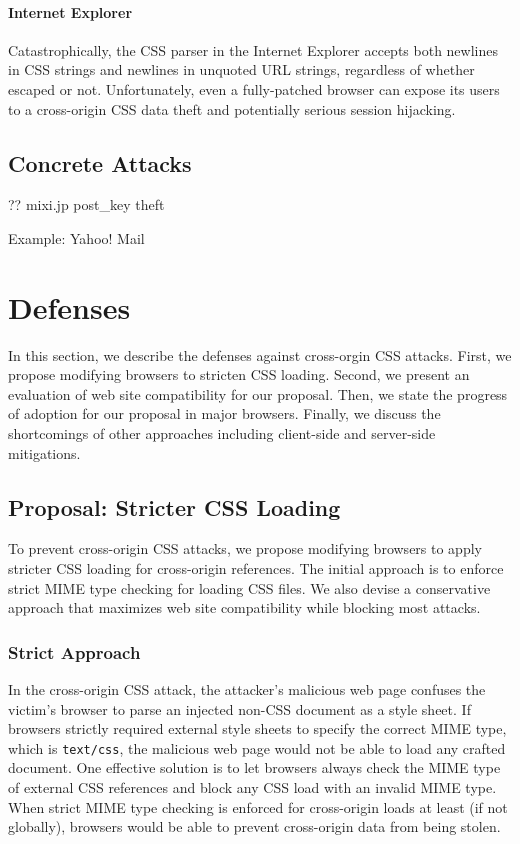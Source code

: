 \documentclass{acm_proc_article-sp}
\begin{document}
{\paragraph{Internet Explorer}
Catastrophically, the CSS parser in the Internet Explorer accepts both newlines in CSS strings and newlines in unquoted URL strings, regardless of whether escaped or not. Unfortunately, even a fully-patched browser can expose its users to a cross-origin CSS data theft and potentially serious session hijacking.

\subsection{Concrete Attacks}
?? mixi.jp post\_key theft\cite{cssxss}

Example: Yahoo! Mail

\section{Defenses}
In this section, we describe the defenses against cross-orgin CSS attacks. First, we propose modifying browsers to stricten CSS loading. Second, we present an evaluation of web site compatibility for our proposal. Then, we state the progress of adoption for our proposal in major browsers. Finally, we discuss the shortcomings of other approaches including client-side and server-side mitigations.

\subsection{Proposal: Stricter CSS Loading}
To prevent cross-origin CSS attacks, we propose modifying browsers to apply stricter CSS loading for cross-origin references. The initial approach is to enforce strict MIME type checking for loading CSS files. We also devise a conservative approach that maximizes web site compatibility while blocking most attacks.

\subsubsection{Strict Approach}
In the cross-origin CSS attack, the attacker's malicious web page confuses the victim's browser to parse an injected non-CSS document as a style sheet. If browsers strictly required external style sheets to specify the correct MIME type, which is \texttt{text/css}, the malicious web page would not be able to load any crafted document. One effective solution is to let browsers always check the MIME type of external CSS references and block any CSS load with an invalid MIME type. When strict MIME type checking is enforced for cross-origin loads at least (if not globally), browsers would be able to prevent cross-origin data from being stolen.

}
\end{document}
